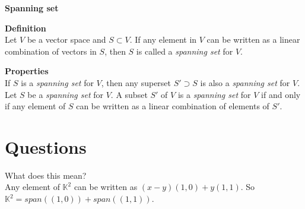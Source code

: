 \documentclass{article}
\begin{document}
\begin{framed}

\textbf{Spanning set}

\begin{framed}
\textbf{Definition}\\
Let $V$ be a vector space and $S\subset V$. If any element in $V$ can be written as a linear combination of vectors in $S$, then $S$ is called a \textit{spanning set} for $V$.
\end{framed}

\begin{framed}
\textbf{Properties}\\
If $S$ is a \textit{spanning set} for $V$, then any superset $S'\supset S$ is also a \textit{spanning set} for $V$.\\
Let $S$ be a \textit{spanning set} for $V$. A subset $S'$ of $V$ is a \textit{spanning set} for $V$ if and only if any element of $S$ can be written as a linear combination of elements of $S'$.
\end{framed}

\end{framed}

\section{Questions}

\begin{framed}
    What does this mean?\\
    Any element of $\mathbb{K}^{2}$ can be written as $(x-y)(1,0) + y(1,1)$. So $\mathbb{K}^{2}=span((1,0))+span((1,1))$.
\end{framed}
\end{document}
